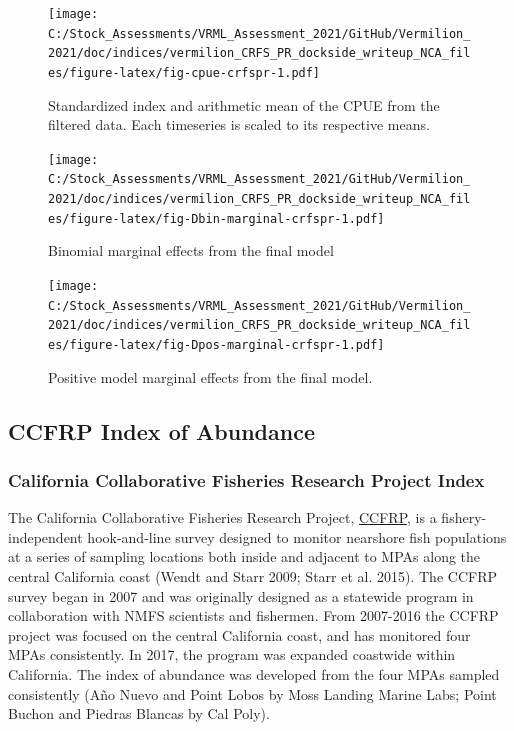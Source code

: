 \documentclass[
  english,
  a4paper,
]{article}
\begin{document}
\begin{figure}
\centering
\texttt{[image: C:/Stock\_Assessments/VRML\_Assessment\_2021/GitHub/Vermilion\_2021/doc/indices/vermilion\_CRFS\_PR\_dockside\_writeup\_NCA\_files/figure-latex/fig-cpue-crfspr-1.pdf]}
\caption{\label{fig:fig-cpue-crfspr}Standardized index and arithmetic mean of the CPUE from the filtered data. Each timeseries is scaled to its respective means.}
\end{figure}

\begin{figure}
\centering
\texttt{[image: C:/Stock\_Assessments/VRML\_Assessment\_2021/GitHub/Vermilion\_2021/doc/indices/vermilion\_CRFS\_PR\_dockside\_writeup\_NCA\_files/figure-latex/fig-Dbin-marginal-crfspr-1.pdf]}
\caption{\label{fig:fig-Dbin-marginal-crfspr}Binomial marginal effects from the final model}
\end{figure}

\begin{figure}
\centering
\texttt{[image: C:/Stock\_Assessments/VRML\_Assessment\_2021/GitHub/Vermilion\_2021/doc/indices/vermilion\_CRFS\_PR\_dockside\_writeup\_NCA\_files/figure-latex/fig-Dpos-marginal-crfspr-1.pdf]}
\caption{\label{fig:fig-Dpos-marginal-crfspr}Positive model marginal effects from the final model.}
\end{figure}

\clearpage

\hypertarget{ccfrp-index-of-abundance}{%
\subsection{CCFRP Index of Abundance}\label{ccfrp-index-of-abundance}}

\hypertarget{california-collaborative-fisheries-research-project-index}{%
\subsubsection{California Collaborative Fisheries Research Project Index}\label{california-collaborative-fisheries-research-project-index}}

The California Collaborative Fisheries Research Project, \href{https://www.mlml.calstate.edu/ccfrp/}{CCFRP},
is a fishery-independent
hook-and-line survey designed to monitor nearshore fish populations at a series of sampling
locations both inside and adjacent to MPAs along the central California coast
(Wendt and Starr 2009; Starr et al. 2015). The CCFRP survey began in 2007 and was originally
designed as a statewide program in collaboration with NMFS scientists and fishermen.
From 2007-2016 the CCFRP project was focused on the central California coast, and has monitored
four MPAs consistently. In 2017,
the program was expanded coastwide within California. The index of abundance was
developed from the four MPAs sampled consistently (Año Nuevo and Point Lobos
by Moss Landing Marine Labs; Point Buchon and Piedras Blancas by Cal Poly).
\end{document}
